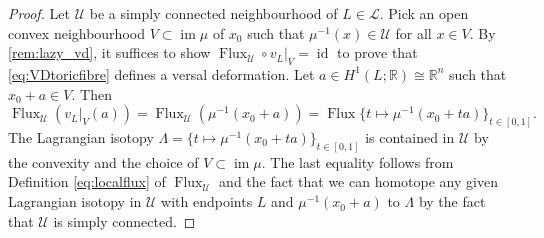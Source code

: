 \documentclass[12pt,a4paper,draft]{scrartcl}
\DeclareMathOperator{\id}{id}
\begin{document}
\begin{proof}
    Let $\mathcal{U}$ be a simply connected neighbourhood of $L \in \mathcal{L}$.
    Pick an open convex neighbourhood $V \subset \operatorname{im} \mu$ of $x_0$ such that $\mu^{-1}(x) \in \mathcal{U}$ for all $x \in V$.
    By \cref{rem:lazy_vd}, it suffices to show $\operatorname{Flux}_{\mathcal{U}} \circ v_L\vert_{V} = \id$ to prove that \eqref{eq:VDtoricfibre} defines a versal deformation.
    Let $a \in H^1(L;\mathbb{R}) \cong \mathbb{R}^n$ such that $x_0 + a \in V$.
Then 
    \begin{equation}
        \operatorname{Flux}_{\mathcal{U}} ( v_L\vert_{V} (a))
        = \operatorname{Flux}_{\mathcal{U}} (\mu^{-1}(x_0 + a))
        = \operatorname{Flux} \{t \mapsto \mu^{-1}(x_0 + ta) \}_{t \in [0,1]}.
    \end{equation}
    The Lagrangian isotopy $\Lambda = \{t \mapsto \mu^{-1}(x_0 + ta) \}_{t \in [0,1]}$ is contained in $\mathcal{U}$ by the convexity and the choice of $V \subset \operatorname{im} \mu$.
    The last equality follows from Definition \eqref{eq:localflux} of $\operatorname{Flux}_{\mathcal{U}}$ and the fact that we can homotope any given Lagrangian isotopy in $\mathcal{U}$ with endpoints $L$ and $\mu^{-1}(x_0 + a)$ to $\Lambda$ by the fact that $\mathcal{U}$ is simply connected. 


\end{proof}
\end{document}
